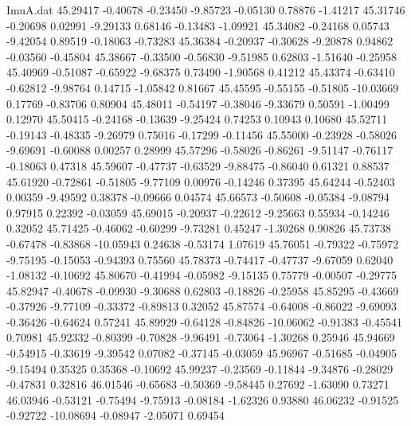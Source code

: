 \begin{filecontents}{ImuA.dat}
  45.29417   -0.40678   -0.23450   -9.85723   -0.05130    0.78876   -1.41217
  45.31746   -0.20698    0.02991   -9.29133    0.68146   -0.13483   -1.09921
  45.34082   -0.24168    0.05743   -9.42054    0.89519   -0.18063   -0.73283
  45.36384   -0.20937   -0.30628   -9.20878    0.94862   -0.03560   -0.45804
  45.38667   -0.33500   -0.56830   -9.51985    0.62803   -1.51640   -0.25958
  45.40969   -0.51087   -0.65922   -9.68375    0.73490   -1.90568    0.41212
  45.43374   -0.63410   -0.62812   -9.98764    0.14715   -1.05842    0.81667
  45.45595   -0.55155   -0.51805  -10.03669    0.17769   -0.83706    0.80904
  45.48011   -0.54197   -0.38046   -9.33679    0.50591   -1.00499    0.12970
  45.50415   -0.24168   -0.13639   -9.25424    0.74253    0.10943    0.10680
  45.52711   -0.19143   -0.48335   -9.26979    0.75016   -0.17299   -0.11456
  45.55000   -0.23928   -0.58026   -9.69691   -0.60088    0.00257    0.28999
  45.57296   -0.58026   -0.86261   -9.51147   -0.76117   -0.18063    0.47318
  45.59607   -0.47737   -0.63529   -9.88475   -0.86040    0.61321    0.88537
  45.61920   -0.72861   -0.51805   -9.77109    0.00976   -0.14246    0.37395
  45.64244   -0.52403    0.00359   -9.49592    0.38378   -0.09666    0.04574
  45.66573   -0.50608   -0.05384   -9.08794    0.97915    0.22392   -0.03059
  45.69015   -0.20937   -0.22612   -9.25663    0.55934   -0.14246    0.32052
  45.71425   -0.46062   -0.60299   -9.73281    0.45247   -1.30268    0.90826
  45.73738   -0.67478   -0.83868  -10.05943    0.24638   -0.53174    1.07619
  45.76051   -0.79322   -0.75972   -9.75195   -0.15053   -0.94393    0.75560
  45.78373   -0.74417   -0.47737   -9.67059    0.62040   -1.08132   -0.10692
  45.80670   -0.41994   -0.05982   -9.15135    0.75779   -0.00507   -0.29775
  45.82947   -0.40678   -0.09930   -9.30688    0.62803   -0.18826   -0.25958
  45.85295   -0.43669   -0.37926   -9.77109   -0.33372   -0.89813    0.32052
  45.87574   -0.64008   -0.86022   -9.69093   -0.36426   -0.64624    0.57241
  45.89929   -0.64128   -0.84826  -10.06062   -0.91383   -0.45541    0.70981
  45.92332   -0.80399   -0.70828   -9.96491   -0.73064   -1.30268    0.25946
  45.94669   -0.54915   -0.33619   -9.39542    0.07082   -0.37145   -0.03059
  45.96967   -0.51685   -0.04905   -9.15494    0.35325    0.35368   -0.10692
  45.99237   -0.23569   -0.11844   -9.34876   -0.28029   -0.47831    0.32816
  46.01546   -0.65683   -0.50369   -9.58445    0.27692   -1.63090    0.73271
  46.03946   -0.53121   -0.75494   -9.75913   -0.08184   -1.62326    0.93880
  46.06232   -0.91525   -0.92722  -10.08694   -0.08947   -2.05071    0.69454

\end{filecontents}
